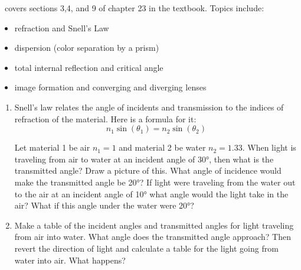 \week \ covers sections 3,4, and 9 of chapter 23 in the textbook. Topics include:

\begin{itemize}
	\item refraction and Snell's Law
	\item dispersion (color separation by a prism)
	\item total internal reflection and critical angle
	\item image formation and converging and diverging lenses
\end{itemize}

\begin{enumerate}
\setlength\itemsep{2 in}

\item 
Snell's law relates the angle of incidents and transmission to the indices of refraction of the material. Here is a formula for it:
\[n_1 \sin \left(\theta_1\right)=n_2 \sin \left(\theta_2\right)\]

Let material 1 be air $n_1=1$ and material 2 be water $n_2 = 1.33$. When light is traveling from air to water at an incident angle of \ang{30}, then what is the transmitted angle? Draw a picture of this. What angle of incidence would make the transmitted angle be \ang{20}? If light were traveling from the water out to the air at an incident angle of \ang{10} what angle would the light take in the air? What if this angle under the water were \ang{20}?

\item
Make a table of the incident angles and transmitted angles for light traveling from air into water. What angle does the transmitted angle approach? Then revert the direction of light and calculate a table for the light going from water into air. What happens?


\end{enumerate}
